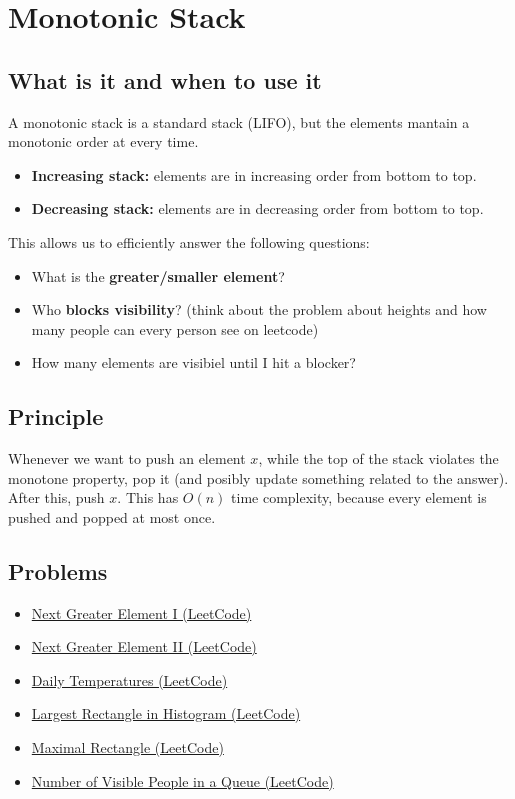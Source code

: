 \documentclass[12pt]{article}
\begin{document}
\section{Monotonic Stack}

\subsection{What is it and when to use it}

A monotonic stack is a standard stack (LIFO), but the elements mantain a monotonic order at every time.
\begin{itemize}
    \item \textbf{Increasing stack:} elements are in increasing order from bottom to top.
    \item \textbf{Decreasing stack:} elements are in decreasing order from bottom to top.
\end{itemize}

This allows us to efficiently answer the following questions:
\begin{itemize}
    \item What is the \textbf{greater/smaller element}?
    \item Who \textbf{blocks visibility}? (think about the problem about heights and how many people can every person see on leetcode)
    \item How many elements are visibiel until I hit a blocker?
\end{itemize}

\subsection{Principle}

Whenever we want to push an element $x$, while the top of the stack violates the monotone property, pop it (and posibly update something related to the answer). After this, push $x$. This has $O(n)$ time complexity, because every element is pushed and popped at most once.

\subsection{Problems}
\begin{itemize}
    \item \href{https://leetcode.com/problems/next-greater-element-i/}{Next Greater Element I (LeetCode)}
    \item \href{https://leetcode.com/problems/next-greater-element-ii/}{Next Greater Element II (LeetCode)}
    \item \href{https://leetcode.com/problems/daily-temperatures/}{Daily Temperatures (LeetCode)}
    \item \href{https://leetcode.com/problems/largest-rectangle-in-histogram/}{Largest Rectangle in Histogram (LeetCode)}
    \item \href{https://leetcode.com/problems/maximal-rectangle/}{Maximal Rectangle (LeetCode)}
    \item \href{https://leetcode.com/problems/number-of-visible-people-in-a-queue/description/?envType=company&envId=google&favoriteSlug=google-thirty-days} {Number of Visible People in a Queue (LeetCode)}
\end{itemize}
\end{document}
